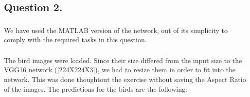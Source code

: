 \documentclass[a4paper]{iacas}
\begin{document}
\newpage
\subsection{Question 2.}
\subsubsection{}
We have used the MATLAB version of the network, out of its simplicity to comply with the required tasks in this question. 

\subsubsection{}
The bird images were loaded. Since their size differed from the input size to the VGG16 network ([224X224X3]), we had to resize them in order to fit into the network. This was done thoughtout the exercise without saving the Aspect Ratio of the images. The predictions for the birds are the following:
\end{document}
